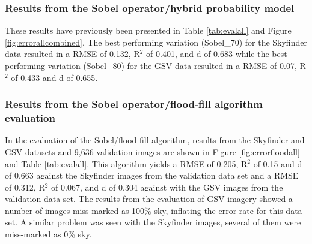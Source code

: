 \documentclass[final,3p,times,authoryear]{elsarticle}
\begin{document}
\subsubsection{Results from the \cite{Wang2015a} Sobel operator/hybrid probability model}
These results have previously been presented in Table \ref{tab:evalall} and Figure \ref{fig:errorallcombined}. The best performing variation (Sobel\_70) for the Skyfinder data resulted in a RMSE of 0.132, R$^{2}$ of 0.401, and d of 0.683 while the best performing variation (Sobel\_80) for the GSV data resulted in a RMSE of 0.07, R$^{2}$ of 0.433 and d of 0.655.

\subsubsection{Results from the \cite{Middel2018} Sobel operator/flood-fill algorithm evaluation}\label{sec:resultsflood}
In the evaluation of the Sobel/flood-fill algorithm, results from the Skyfinder and GSV datasets and 9,636 validation images are shown in Figure \ref{fig:errorfloodall} and Table \ref{tab:evalall}. This algorithm yields a RMSE of 0.205, R$^{2}$ of 0.15 and d of 0.663 against the Skyfinder images from the validation data set and a RMSE of 0.312, R$^{2}$ of 0.067, and d of 0.304 against with the GSV images from the validation data set. The results from the evaluation of GSV imagery showed a number of images miss-marked as 100\% sky, inflating the error rate for this data set. A similar problem was seen with the Skyfinder images, several of them were miss-marked as 0\% sky.
\end{document}
